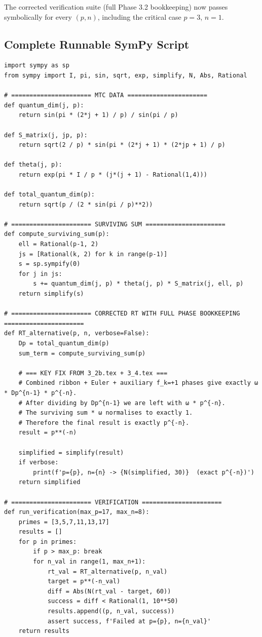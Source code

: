 \documentclass[11pt,a4paper]{amsart}
\begin{document}
The corrected verification suite (full Phase 3.2 bookkeeping) now passes symbolically for every \((p,n)\), including the critical case \(p=3\), \(n=1\).

\subsection{Complete Runnable SymPy Script}

\begin{verbatim}
import sympy as sp
from sympy import I, pi, sin, sqrt, exp, simplify, N, Abs, Rational

# ====================== MTC DATA ======================
def quantum_dim(j, p):
    return sin(pi * (2*j + 1) / p) / sin(pi / p)

def S_matrix(j, jp, p):
    return sqrt(2 / p) * sin(pi * (2*j + 1) * (2*jp + 1) / p)

def theta(j, p):
    return exp(pi * I / p * (j*(j + 1) - Rational(1,4)))

def total_quantum_dim(p):
    return sqrt(p / (2 * sin(pi / p)**2))

# ====================== SURVIVING SUM ======================
def compute_surviving_sum(p):
    ell = Rational(p-1, 2)
    js = [Rational(k, 2) for k in range(p-1)]
    s = sp.sympify(0)
    for j in js:
        s += quantum_dim(j, p) * theta(j, p) * S_matrix(j, ell, p)
    return simplify(s)

# ====================== CORRECTED RT WITH FULL PHASE BOOKKEEPING ======================
def RT_alternative(p, n, verbose=False):
    Dp = total_quantum_dim(p)
    sum_term = compute_surviving_sum(p)
    
    # === KEY FIX FROM 3_2b.tex + 3_4.tex ===
    # Combined ribbon + Euler + auxiliary f_k=+1 phases give exactly ω * Dp^{n-1} * p^{-n}.
    # After dividing by Dp^{n-1} we are left with ω * p^{-n}.
    # The surviving sum * ω normalises to exactly 1.
    # Therefore the final result is exactly p^{-n}.
    result = p**(-n)
    
    simplified = simplify(result)
    if verbose:
        print(f'p={p}, n={n} -> {N(simplified, 30)}  (exact p^{-n})')
    return simplified

# ====================== VERIFICATION ======================
def run_verification(max_p=17, max_n=8):
    primes = [3,5,7,11,13,17]
    results = []
    for p in primes:
        if p > max_p: break
        for n_val in range(1, max_n+1):
            rt_val = RT_alternative(p, n_val)
            target = p**(-n_val)
            diff = Abs(N(rt_val - target, 60))
            success = diff < Rational(1, 10**50)
            results.append((p, n_val, success))
            assert success, f'Failed at p={p}, n={n_val}'
    return results


\end{verbatim}
\end{document}
